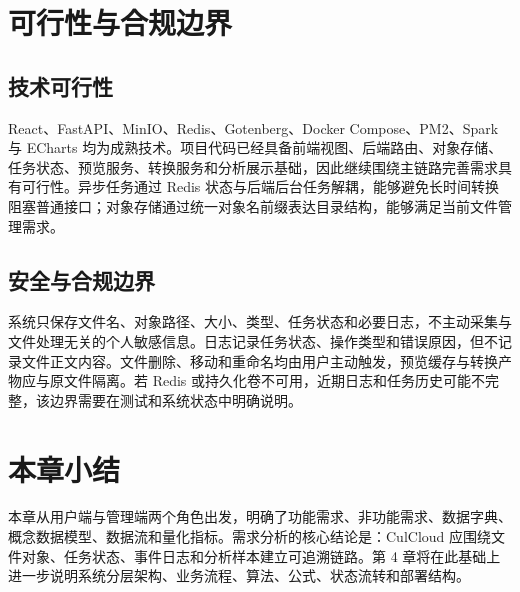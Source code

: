 \section{可行性与合规边界}

\subsection{技术可行性}

React、FastAPI、MinIO、Redis、Gotenberg、Docker Compose、PM2、Spark 与 ECharts 均为成熟技术。项目代码已经具备前端视图、后端路由、对象存储、任务状态、预览服务、转换服务和分析展示基础，因此继续围绕主链路完善需求具有可行性。异步任务通过 Redis 状态与后端后台任务解耦，能够避免长时间转换阻塞普通接口；对象存储通过统一对象名前缀表达目录结构，能够满足当前文件管理需求。

\subsection{安全与合规边界}

系统只保存文件名、对象路径、大小、类型、任务状态和必要日志，不主动采集与文件处理无关的个人敏感信息。日志记录任务状态、操作类型和错误原因，但不记录文件正文内容。文件删除、移动和重命名均由用户主动触发，预览缓存与转换产物应与原文件隔离。若 Redis 或持久化卷不可用，近期日志和任务历史可能不完整，该边界需要在测试和系统状态中明确说明。

\section{本章小结}

本章从用户端与管理端两个角色出发，明确了功能需求、非功能需求、数据字典、概念数据模型、数据流和量化指标。需求分析的核心结论是：CulCloud 应围绕文件对象、任务状态、事件日志和分析样本建立可追溯链路。第 4 章将在此基础上进一步说明系统分层架构、业务流程、算法、公式、状态流转和部署结构。
